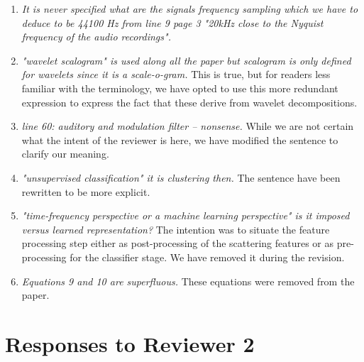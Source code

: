 \documentclass[10pt]{article}
\begin{document}
\begin{enumerate}
\item \emph{It is never specified what are the signals frequency sampling which we have to deduce to be 44100 Hz from line 9 page 3 "20kHz close to the Nyquist frequency of the audio recordings".}

\item \emph{"wavelet scalogram" is used along all the paper but scalogram is only defined for wavelets since 
it is a scale-o-gram.}
This is true, but for readers less familiar with the terminology, we have opted to use this more redundant expression to express the fact that these derive from wavelet decompositions.

\item \emph{line 60: auditory and modulation filter – nonsense.}
While we are not certain what the intent of the reviewer is here, we have modified the sentence to clarify our meaning.

\item \emph{"unsupervised classification" it is clustering then.}
The sentence have been rewritten to be more explicit.

\item \emph{"time-frequency perspective or a machine learning perspective" is it imposed versus learned representation? }
The intention was to situate the feature processing step either as post-processing of the scattering features or as pre-processing for the classifier stage. We have removed it during the revision.

\item \emph{Equations 9 and 10 are superfluous.}
These equations were removed from the paper.

\end{enumerate}

\section{Responses to Reviewer 2}
\end{document}
